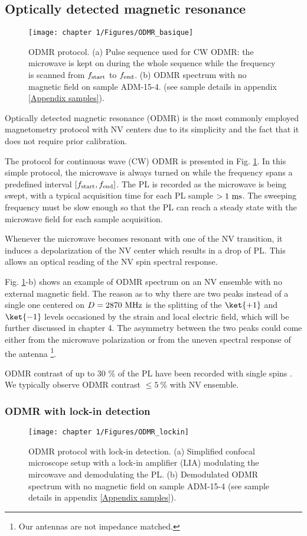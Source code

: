 \documentclass[a4paper, 11pt]{report}
\begin{document}
\subsection{Optically detected magnetic resonance}
\begin{figure}[h!]
\centering
\texttt{[image: chapter 1/Figures/ODMR\_basique]}
\caption{ODMR protocol. (a) Pulse sequence used for CW ODMR: the microwave is kept on during the whole sequence while the frequency is scanned from $f_{\rm start}$ to $f_{\rm end}$. (b) ODMR spectrum with no magnetic field on sample ADM-15-4. (see sample details in appendix \ref{Appendix samples}).}
\label{ODMR basique}
\end{figure}

Optically detected magnetic resonance (ODMR) is the most commonly employed magnetometry protocol with NV centers due to its simplicity and the fact that it does not require prior calibration.

The protocol for continuous wave (CW) ODMR is presented in Fig. \ref{ODMR basique}. In this simple protocol, the microwave is always turned on while the frequency spans a predefined interval $[f_{\rm start}, f_{\rm end}]$. The PL is recorded as the microwave is being swept, with a typical acquisition time for each PL sample $> 1\ \rm ms$. The sweeping frequency must be slow enough so that the PL can reach a steady state with the microwave field for each sample acquisition. 

Whenever the microwave becomes resonant with one of the NV transition, it induces a depolarization of the NV center which results in a drop of PL. This allows an optical reading of the NV spin spectral response. 

Fig. \ref{ODMR basique}-b) shows an example of ODMR spectrum on an NV ensemble with no external magnetic field. The reason as to why there are two peaks instead of a single one centered on $D=2870\ \rm MHz$ is the splitting of the $\ket{+1}$ and $\ket{-1}$ levels occasioned by the strain and local electric field, which will be further discussed in chapter 4. The asymmetry between the two peaks could come either from the microwave polarization or from the uneven spectral response of the antenna \footnote{Our antennas are not impedance matched.}. 

ODMR contrast of up to 30 \% of the PL have been recorded with single spins \citep{dreau2011avoiding}. We typically observe ODMR contrast $\leq 5\ \%$ with NV ensemble.

\subsubsection{ODMR with lock-in detection}
\begin{figure}[h!]
\centering
\texttt{[image: chapter 1/Figures/ODMR\_lockin]}
\caption{ODMR protocol with lock-in detection. (a) Simplified confocal microscope setup with a lock-in amplifier (LIA) modulating the mircowave and demodulating the PL. (b) Demodulated ODMR spectrum with no magnetic field on sample ADM-15-4 (see sample details in appendix \ref{Appendix samples}).}
\label{ODMR lockin}
\end{figure}
\end{document}
